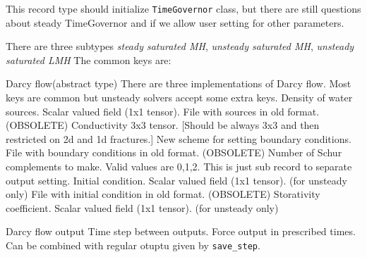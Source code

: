 \documentclass[12pt,a4paper]{report}
\begin{document}
This record type should initialize \verb'TimeGovernor' class, but there are still questions about steady TimeGovernor and 
if we allow user setting for other parameters.

There are three subtypes {\it steady saturated MH}, {\it unsteady saturated MH}, {\it unsteady saturated LMH}
The common keys are:

\begin{recordtype}{Darcy flow}{(abstract type)}
  There are three implementations of Darcy flow. Most keys are common but unsteady solvers accept some extra keys.
 Density of water sources. Scalar valued field (1x1 tensor).
File with sources in old format. (OBSOLETE)
%
Conductivity 3x3 tensor. [Should be always 3x3 and then restricted on 2d and 1d fractures.]
New scheme for setting boundary conditions.
File with boundary conditions in old format. (OBSOLETE)
%
Number of Schur complements to make. Valid values are 0,1,2.
%
This is just sub record to separate output setting. 
%
Initial condition. Scalar valued field (1x1 tensor). (for unsteady only)
File with initial condition in old format. (OBSOLETE)
%
Storativity coefficient. Scalar valued field (1x1 tensor). (for unsteady only)
\end{recordtype}

\begin{recordtype}{Darcy flow output}{}
Time step between outputs.
Force output in prescribed times. Can be combined with regular otuptu given by \verb'save_step'.
\end{recordtype}
 
\end{document}
